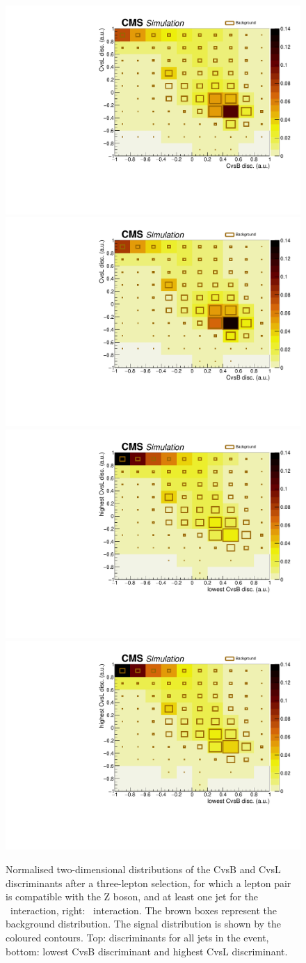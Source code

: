 \begin{figure}[htbp] 
	\includegraphics[width=0.49\linewidth]{7_Conclusion/Figures/charmtaggingnew/CvsBCvsLdiscZct}
	\includegraphics[width=0.49\linewidth]{7_Conclusion/Figures/charmtaggingnew/CvsBCvsLdiscZut}
	\includegraphics[width=0.49\linewidth]{7_Conclusion/Figures/charmtaggingnew/CvsBdiscLowCvsLdiscHighZct}
	\includegraphics[width=0.49\linewidth]{7_Conclusion/Figures/charmtaggingnew/CvsBdiscLowCvsLdiscHighZut}
	\caption{Normalised two-dimensional distributions of the CvsB and CvsL discriminants after a three-lepton selection, for which a lepton pair is compatible with the Z boson, and at least one jet  for the \Zct\ interaction, right: \Zut\ interaction. The brown boxes represent the background distribution. The signal distribution is shown by the coloured contours.  Top: discriminants for all jets in the event, bottom: lowest CvsB discriminant and highest CvsL discriminant. }
	\label{fig:ctagg2d}
\end{figure}

